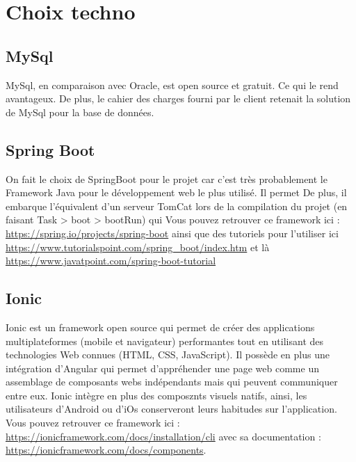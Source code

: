 	\section{Choix techno}


		\subsection{MySql}
			MySql, en comparaison avec Oracle, est open source et gratuit. Ce qui le rend avantageux.
			De plus, le cahier des charges fourni par le client retenait la solution de MySql pour la base de données.

		\subsection{Spring Boot}
			On fait le choix de SpringBoot pour le projet car c'est très probablement le Framework Java pour le développement web le plus utilisé. Il permet
			De plus, il embarque l'équivalent d'un serveur TomCat lors de la compilation du projet (en faisant Task > boot > bootRun) qui
			Vous pouvez retrouver ce framework ici : \url{https://spring.io/projects/spring-boot} ainsi que des tutoriels pour l'utiliser ici \url{https://www.tutorialspoint.com/spring_boot/index.htm} et là \url{https://www.javatpoint.com/spring-boot-tutorial}

		\subsection{Ionic}
			Ionic est un framework open source qui permet de créer des applications multiplateformes (mobile et navigateur) performantes tout en utilisant des technologies Web connues (HTML, CSS, JavaScript). Il possède en plus une intégration d'Angular qui permet d'appréhender une page web comme un assemblage de composants webs indépendants mais qui peuvent communiquer entre eux.
			Ionic intègre en plus des composznts visuels natifs, ainsi, les utilisateurs d'Android ou d'iOs conserveront leurs habitudes sur l'application.
			Vous pouvez retrouver ce framework ici : \url{https://ionicframework.com/docs/installation/cli} avec sa documentation : \url{https://ionicframework.com/docs/components}.

